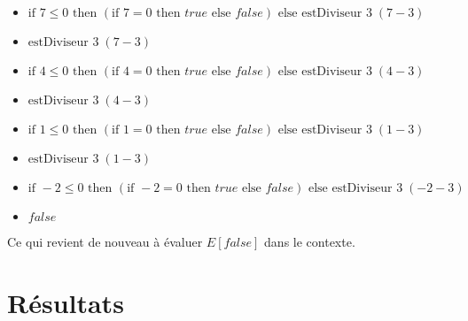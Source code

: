 \documentclass[11pt, a4paper, notitlepage]{article}
\begin{document}
\begin{itemize}[label=$\to$]
   \item $\text{if } 7 \leq 0 \text{ then }(\text{if } 7 = 0 \text{ then } true \text{ else } false)\text{ else estDiviseur } 3 \; (7 - 3)$\\
   \item $\text{estDiviseur } 3 \; (7 - 3)$\\
   \item $\text{if } 4 \leq 0 \text{ then }(\text{if } 4 = 0 \text{ then } true \text{ else } false)\text{ else estDiviseur } 3 \; (4 - 3)$\\
   \item $\text{estDiviseur } 3 \; (4 - 3)$\\
   \item $\text{if } 1 \leq 0 \text{ then }(\text{if } 1 = 0 \text{ then } true \text{ else } false)\text{ else estDiviseur } 3 \; (1 - 3)$\\
   \item $\text{estDiviseur } 3 \; (1 - 3)$\\
   \item $\text{if } -2 \leq 0 \text{ then }(\text{if } -2 = 0 \text{ then } true \text{ else } false)\text{ else estDiviseur } 3 \; (-2 - 3)$\\
   \item $false$
\end{itemize}
Ce qui revient de nouveau à évaluer $E[false]$ dans le contexte.

\section{Résultats}
\end{document}

